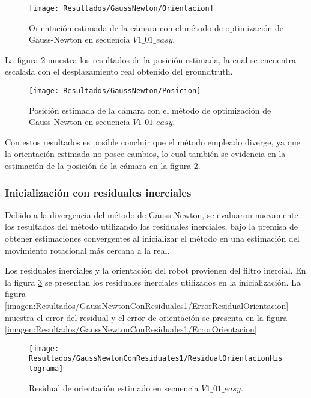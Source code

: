 \begin{figure}[H]
	\centering
	\texttt{[image: Resultados/GaussNewton/Orientacion]}
	\caption[Orientación estimada con el]{Orientación estimada de la cámara con el método de optimización de Gauss-Newton en secuencia $V1\_ 01\_ easy$. }
	\label{imagen:Resultados/GaussNewton/Orientacion}
\end{figure}

 La figura \ref{imagen:Resultados/GaussNewton/Posicion} muestra los resultados de la posición estimada, la cual se encuentra escalada con el desplazamiento real obtenido del groundtruth. 
 

\begin{figure}[H]
	\centering
	\texttt{[image: Resultados/GaussNewton/Posicion]}
	\caption{Posición estimada de la cámara con el método de optimización de Gauss-Newton en secuencia $V1\_ 01\_ easy$. }
	\label{imagen:Resultados/GaussNewton/Posicion}
\end{figure}

Con estos resultados es posible concluir que el método empleado diverge, ya que la orientación estimada no posee cambios, lo cual también se evidencia en la estimación de la posición de la cámara  en la figura \ref{imagen:Resultados/GaussNewton/Posicion}.

\subsubsection{Inicialización con residuales inerciales}
Debido a la divergencia del método de Gauss-Newton, se evaluaron nuevamente los resultados del método utilizando los residuales inerciales,  bajo la premisa de obtener estimaciones convergentes al inicializar el método en una estimación del movimiento rotacional más cercana a la real.

Los residuales inerciales y la orientación del robot provienen del filtro inercial. En la figura \ref{imagen:Resultados/GaussNewtonConResiduales1/ResidualOrientacionHistograma} se presentan los residuales inerciales utilizados en la inicialización. La figura \ref{imagen:Resultados/GaussNewtonConResiduales1/ErrorResidualOrientacion} muestra el error del residual y el error de orientación  se presenta en la figura \ref{imagen:Resultados/GaussNewtonConResiduales1/ErrorOrientacion}.

\begin{figure}[H]
	\centering
	\texttt{[image: Resultados/GaussNewtonConResiduales1/ResidualOrientacionHistograma]}
	\caption{ Residual de orientación estimado en secuencia $V1\_ 01\_ easy$.}
	\label{imagen:Resultados/GaussNewtonConResiduales1/ResidualOrientacionHistograma}
\end{figure}


